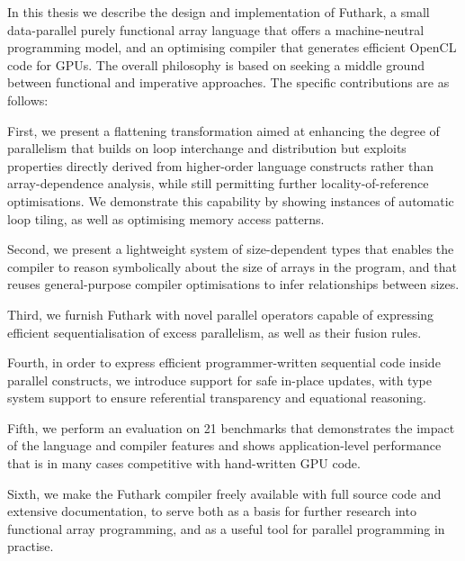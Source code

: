 In this thesis we describe the design and implementation of Futhark, a
small data-parallel purely functional array language that offers a
machine-neutral programming model, and an optimising compiler that
generates efficient OpenCL code for GPUs.  The overall philosophy is
based on seeking a middle ground between functional and imperative
approaches.  The specific contributions are as follows:

First, we present a flattening transformation aimed at enhancing the
degree of parallelism that builds on loop interchange and distribution
but exploits properties directly derived from higher-order language
constructs rather than array-dependence analysis, while still
permitting further locality-of-reference optimisations.  We
demonstrate this capability by showing instances of automatic loop
tiling, as well as optimising memory access patterns.

Second, we present a lightweight system of size-dependent types that
enables the compiler to reason symbolically about the size of arrays
in the program, and that reuses general-purpose compiler optimisations
to infer relationships between sizes.

Third, we furnish Futhark with novel parallel operators capable of
expressing efficient sequentialisation of excess parallelism, as well
as their fusion rules.

Fourth, in order to express efficient programmer-written sequential
code inside parallel constructs, we introduce support for safe
in-place updates, with type system support to ensure referential
transparency and equational reasoning.

Fifth, we perform an evaluation on 21 benchmarks that demonstrates the
impact of the language and compiler features and shows
application-level performance that is in many cases competitive with
hand-written GPU code.

Sixth, we make the Futhark compiler freely available with full source
code and extensive documentation, to serve both as a basis for further
research into functional array programming, and as a useful tool
for parallel programming in practise.

